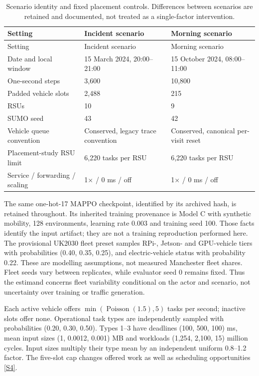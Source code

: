 \documentclass[11pt,a4paper]{article}
\begin{document}
\begingroup
\small
\begin{xltabular}{\textwidth}{@{}YYY@{}}
\caption{Scenario identity and fixed placement controls. Differences between scenarios are retained and documented, not treated as a single-factor intervention.}\label{tab:2} \\
\toprule
Setting & Incident scenario & Morning scenario \\
\midrule\endfirsthead
\toprule
Setting & Incident scenario & Morning scenario \\
\midrule\endhead
\bottomrule\endfoot
Date and local window & 15 March 2024, 20:00--21:00 & 15 October 2024, 08:00--11:00 \\
One-second steps & 3,600 & 10,800 \\
Padded vehicle slots & 2,488 & 215 \\
RSUs & 10 & 9 \\
SUMO seed & 43 & 42 \\
Vehicle queue convention & Conserved, legacy trace convention & Conserved, canonical per-visit reset \\
Placement-study RSU limit & 6,220 tasks per RSU & 6,220 tasks per RSU \\
Service / forwarding / scaling & 1\ensuremath{\times} / 0 ms / off & 1\ensuremath{\times} / 0 ms / off \\
\end{xltabular}
\endgroup

The same one-hot-17 MAPPO checkpoint, identified by its archived hash, is retained throughout. Its inherited training provenance is Model C with synthetic mobility, 128 environments, learning rate 0.003 and training seed 100. Those facts identify the input artifact; they are not a training reproduction performed here. The provisional UK2030 fleet preset samples RPi-, Jetson- and GPU-vehicle tiers with probabilities (0.40, 0.35, 0.25), and electric-vehicle status with probability 0.22. These are modelling assumptions, not measured Manchester fleet shares. Fleet seeds vary between replicates, while evaluator seed 0 remains fixed. Thus the estimand concerns fleet variability conditional on the actor and scenario, not uncertainty over training or traffic generation.

Each active vehicle offers $\min(\operatorname{Poisson}(1.5),5)$ tasks per second; inactive slots offer none. Operational task types are independently sampled with probabilities (0.20, 0.30, 0.50). Types 1--3 have deadlines (100, 500, 100) ms, mean input sizes (1, 0.0012, 0.001) MB and workloads (1,254, 2,100, 15) million cycles. Input sizes multiply their type mean by an independent uniform 0.8--1.2 factor. The five-slot cap changes offered work as well as scheduling opportunities \hyperref[source-s4]{[S4]}.
\end{document}

